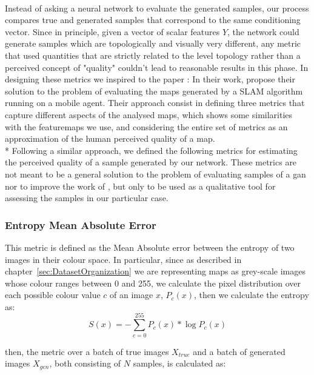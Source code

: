 \paragraph{} Instead of asking a neural network to evaluate the generated samples, our process compares true and generated samples that correspond to the same conditioning vector. Since in principle, given a vector of scalar features $Y$, the network could generate samples which are topologically and visually very different, any metric that used quantities that are strictly related to the level topology rather than a perceived concept of "quality" couldn't lead to reasonable results in this phase. In designing these metrics we inspired to the paper : In their work, \citeauthor{slam} propose their solution to the problem of evaluating the maps generated by a SLAM algorithm running on a mobile agent. Their approach consist in defining three metrics that capture different aspects of the analysed maps, which shows some similarities with the \glspl{featuremap} we use, and considering the entire set of metrics as an approximation of the human perceived quality of a map. 
\\* Following a similar approach, we defined the following metrics for estimating the perceived quality of a sample generated by our network. These metrics are not meant to be a general solution to the problem of evaluating samples of a \gls{gan} nor to improve the work of \citeauthor{slam_metrics}, but only to be used as a qualitative tool for assessing the samples in our particular case.

\subsubsection{Entropy Mean Absolute Error}
\label{sec:entropy_MAE}
This metric is defined as the Mean Absolute error between the entropy of two images in their colour space. In particular, since as described in chapter~\ref{sec:DatasetOrganization} we are representing maps as grey-scale images whose colour ranges between 0 and 255, we calculate the pixel distribution over each possible colour value $c$ of an image $x$, $P_{c}(x)$, then we calculate the entropy as:
\begin{equation}
S(x) = - \sum_{c=0}^{255}{ P_{c}(x) * \log{P_{c}(x)} }
\end{equation}

then, the metric over a batch of true images $X_{true}$ and a batch of generated images $X_{gen}$, both consisting of $N$ samples, is calculated as:

